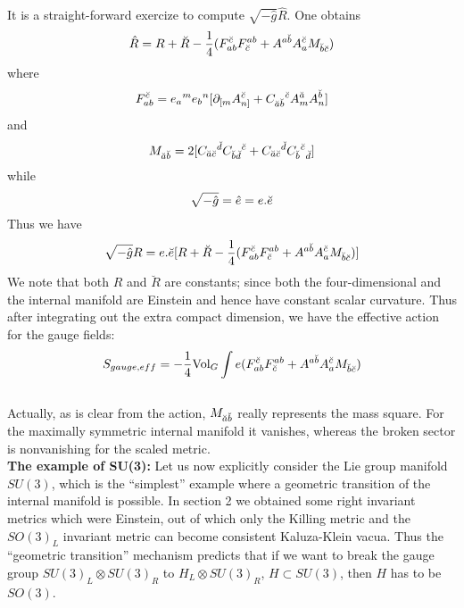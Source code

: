 \documentclass[a4paper,12pt]{article}
\begin{document}
It is a straight-forward exercize to compute $\sqrt{-\hat{g}}\hat{R}$. One obtains
\begin{equation}
\hat{R}=R+\breve{R}-\frac{1}{4}(F_{ab}^{\breve{c}}F^{ab}_{\breve{c}}+A^{a\breve{b}}A_a^{\breve{c}}M_{\breve{b}\breve{c}})
\end{equation}
where
\begin{equation}
F_{ab}^{\breve{c}}=e_a{}^me_b{}^n[\partial_{[m}A^{\breve{c}}_{n]}+C_{\breve{a}\breve{b}}{}^{\breve{c}}A_m^{\breve{a}}A_n^{\breve{b}}]
\end{equation}
and
\begin{equation}
M_{\breve{a}\breve{b}}=2[C_{\breve{a}\breve{c}}{}^{\breve{d}}C_{\breve{b}\breve{d}}{}^{\breve{c}}+C_{\breve{a}\breve{c}}{}^{\breve{d}}C_{\breve{b}}{}^{\breve{c}}{}_{\breve{d}}]
\end{equation}
while 
\begin{equation}
\sqrt{-\hat{g}}=\hat{e}=e.\breve{e}
\end{equation}
Thus we have
\begin{equation}
\sqrt{-\hat{g}}R=e.\breve{e}[R+\breve{R}-\frac{1}{4}(F_{ab}^{\breve{c}}F^{ab}_{\breve{c}}+A^{a\breve{b}}A_a^{\breve{c}}M_{\breve{b}\breve{c}})]
\end{equation}
We note that both $R$ and $\breve{R}$ are constants; since both the four-dimensional and the internal manifold are Einstein and hence have constant scalar curvature. Thus after integrating out the extra compact dimension, we have the effective action for the gauge fields:
\begin{equation}
S_{gauge,eff}=-\frac{1}{4}\mbox{Vol}_G\int e(F_{ab}^{\breve{c}}F^{ab}_{\breve{c}}+A^{a\breve{b}}A_a^{\breve{c}}M_{\breve{b}\breve{c}})
\end{equation}\\
Actually, as is clear from the action, $M_{\breve{a}\breve{b}}$ really represents the mass square. For the maximally symmetric internal manifold it vanishes, whereas the broken sector is nonvanishing for the scaled metric. 
\vspace{5mm}
\\ 
{\bf The example of SU(3):} Let us now explicitly consider the Lie group manifold $SU(3)$, which is the ``simplest'' example where a geometric transition of the internal manifold is possible. In section 2 we obtained some right invariant metrics which were Einstein, out of which only the Killing metric and the $SO(3)_L$ invariant metric  can become consistent Kaluza-Klein vacua. Thus the ``geometric transition'' mechanism predicts that if we want to break the  gauge group $SU(3)_L\otimes SU(3)_R$ to $H_L\otimes SU(3)_R$, $H\subset SU(3)$, then $H$ has to be $SO(3)$.
\end{document}
